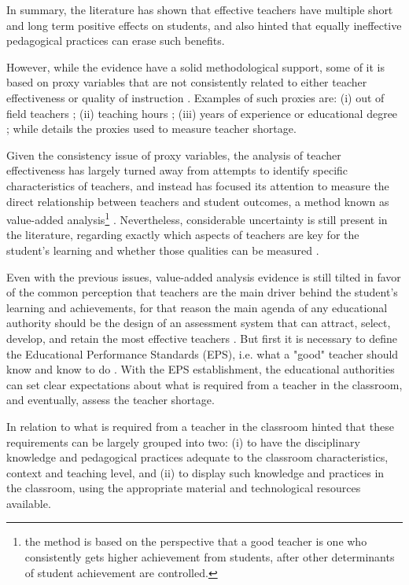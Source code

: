 In summary, the literature has shown that effective teachers have multiple short and long term positive effects on students, and also hinted that equally ineffective pedagogical practices can erase such benefits. 

However, while the evidence have a solid methodological support, some of it is based on proxy variables that are not consistently related to either teacher effectiveness or quality of instruction \citep{Hanushek_et_al_2006}. Examples of such proxies are: (i) out of field teachers \citep{Ingersoll_1998, Dee_et_al_2008, Bertoni_et_al_2020a}; (ii) teaching hours \citep{Bruns_et_al_2015}; (iii) years of experience or educational degree \citep{Rockoff_2004, Rivkin_et_al_2005, Clotfelter_et_al_2006, Clotfelter_et_al_2007, Hanushek_et_al_2012}; while \citet{Sutcher_et_al_2016} details the proxies used to measure teacher shortage. 

Given the consistency issue of proxy variables, the analysis of teacher effectiveness has largely turned away from attempts to identify specific characteristics of teachers, and instead has focused its attention to measure the direct relationship between teachers and student outcomes, a method known as value-added analysis\footnote{the method is based on the perspective that a good teacher is one who consistently gets higher achievement from students, after other determinants of student achievement are controlled.} \citep{Hanushek_et_al_2012}. Nevertheless, considerable uncertainty is still present in the literature, regarding exactly which aspects of teachers are key for the student's learning and whether those qualities can be measured \citep{Rockoff_2004, Clotfelter_et_al_2006}. 

Even with the previous issues, value-added analysis evidence is still tilted in favor of the common perception that teachers are the main driver behind the student's learning and achievements, for that reason the main agenda of any educational authority should be the design of an assessment system that can attract, select, develop, and retain the most effective teachers \citep{Elacqua_et_al_2018}. But first it is necessary to define the Educational Performance Standards (EPS), i.e. what a "good" teacher should know and know to do \citep{Hincapie_et_al_2020}. With the EPS establishment, the educational authorities can set clear expectations about what is required from a teacher in the classroom, and eventually, assess the teacher shortage.

In relation to what is required from a teacher in the classroom \citet{Hincapie_et_al_2020} hinted that these requirements can be largely grouped into two: (i) to have the disciplinary knowledge and pedagogical practices adequate to the classroom characteristics, context and teaching level, and (ii) to display such knowledge and practices in the classroom, using the appropriate material and technological resources available.

